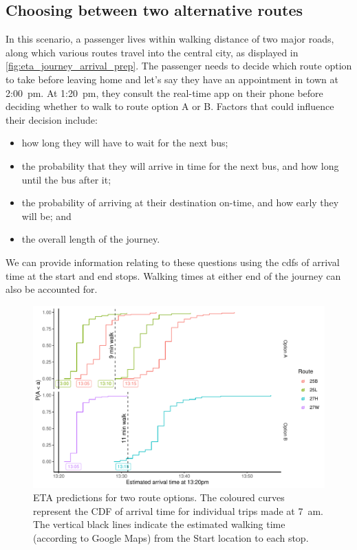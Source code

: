\subsection{Choosing between two alternative routes}
\label{sec:journey_simple}

In this scenario, a passenger lives within walking distance of two major roads, along which various routes travel into the central city, as displayed in \cref{fig:eta_journey_arrival_prep}. The passenger needs to decide which route option to take before leaving home and let's say they have an appointment in town at  2:00~pm. At  1:20~pm, they consult the real-time app on their phone before deciding whether to walk to route option A or B. Factors that could influence their decision include:
\begin{itemize}
\item how long they will have to wait for the next bus;
\item the probability that they will arrive in time for the next bus, and how long until the bus after it;
\item the probability of arriving at their destination on-time, and how early they will be; and
\item the overall length of the journey.
\end{itemize}
We can provide information relating to these questions using the \glspl{cdf} of arrival time at the start and end stops. Walking times at either end of the journey can also be accounted for.


\begin{knitrout}\small
{}\color{fgcolor}\begin{figure}

{\centering \includegraphics[width=\textwidth]{figure/eta_journey_arrival-1} 

}

\caption[ETA predictions for two route options]{ETA predictions for two route options. The coloured curves represent the CDF of arrival time for individual trips made at 7~am. The vertical black lines indicate the estimated walking time (according to Google Maps) from the Start location to each stop.}\label{fig:eta_journey_arrival}
\end{figure}


\end{knitrout}



